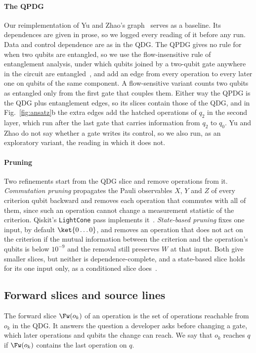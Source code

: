 \paragraph*{The QPDG}
Our reimplementation of Yu and Zhao's graph~\cite{yu2025qpdg} serves as a baseline. Its dependences are given in
prose, so we logged every reading of it before any run. Data and control dependence are as in the QDG. The QPDG
gives no rule for when two qubits are entangled, so we use the flow-insensitive rule of entanglement analysis, under
which qubits joined by a two-qubit gate anywhere in the circuit are entangled~\cite{javadiabhari2015scaffcc}, and
add an edge from every operation to every later one on qubits of the same component. A flow-sensitive variant
counts two qubits as entangled only from the first gate that couples them. Either way the QPDG is the QDG plus
entanglement edges, so its slices contain those of the QDG, and in Fig.~\ref{fig:ansatz}b the extra edges add the
\numAnsYzExtra{} hatched operations of $q_2$ in the second layer, which run after the last gate that carries
information from $q_2$ to $q_0$. Yu and Zhao do not say whether a gate writes its control, so we also run, as an
exploratory variant, the reading in which it does not.

\paragraph*{Pruning}
Two refinements start from the QDG slice and remove operations from it. \emph{Commutation pruning} propagates the
Pauli observables $X$, $Y$ and $Z$ of every criterion qubit backward and removes each operation that commutes with
all of them, since such an operation cannot change a measurement statistic of the criterion. Qiskit's
\texttt{LightCone} pass implements it~\cite{qiskit2025}. \emph{State-based pruning} fixes one input, by default
$\ket{0\dots0}$, and removes an operation that does not act on the criterion if the mutual information between the
criterion and the operation's qubits is below $10^{-9}$ and the removal still preserves $W$ at that input. Both give
smaller slices, but neither is dependence-complete, and a state-based slice holds for its one input only, as a
conditioned slice does~\cite{canfora1998conditioned}.

\subsection{Forward slices and source lines}\label{sec:lines}
The forward slice $\Fw(o_k)$ of an operation is the set of operations reachable from $o_k$ in the QDG. It answers
the question a developer asks before changing a gate, which later operations and qubits the change can reach. We say
that $o_k$ reaches $q$ if $\Fw(o_k)$ contains the last operation on $q$.


